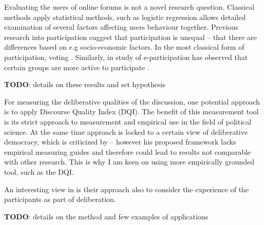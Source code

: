 \documentclass[journal,a4paper]{IEEEtran}
\begin{document}
Evaluating the users of online forums is not a novel research question. Classical methods apply statistical methods, such as logistic regression allows detailed examination of several factors affecting users behaviour together. Previous research into participation suggest that participation is unequal -- that there are differences based on e.g socio-economic factors. In the most classical form of participation, voting . Similarly, in study of e-participation has observed that certain groups are more active to participate \cite{baek11,albrecht06,strandberg08}.

\textbf{TODO}: details on these results and set hypothesis

For measuring the deliberative qualities of the discussion, one potential approach is to apply  Discourse Quality Index (DQI). The benefit of this measurement tool is its strict approach to measurement and empirical use in the field of political science. At the same time  approach is locked to a certain view of deliberative democracy, which is criticized by  -- however his proposed framework lacks empirical measuring guides and therefore could lead to results not comparable with other research. This is why I am keen on using more empirically grounded tool, such as the DQI.

An interesting view in  is their approach also to consider the experience of the participants as part of deliberation.

\textbf{TODO}: details on the method and few examples of applications



\end{document}
